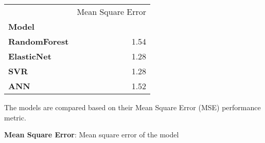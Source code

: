 \documentclass[11pt]{article}
\author{Data to Paper}
\begin{document}
\newsavebox{\mytablebox} %

\begin{lrbox}{\mytablebox}
 \begin{tabular}{lr}
\toprule
{} &  Mean Square Error \\
\textbf{Model       } &                    \\
\midrule
\textbf{RandomForest} &               1.54 \\
\textbf{ElasticNet  } &               1.28 \\
\textbf{SVR         } &               1.28 \\
\textbf{ANN         } &               1.52 \\
\bottomrule
\end{tabular}%
\end{lrbox}

\begin{table}[h]
\caption{Comparison of machine learning models for predicting optimal tracheal tube depth}
\label{table:model_comparisons}
\begin{threeparttable}
\renewcommand{\TPTminimum}{\linewidth}
\begin{tablenotes}
\footnotesize
\item The models are compared based on their Mean Square Error (MSE) performance metric.
\item \textbf{Mean Square Error}: Mean square error of the model
\end{tablenotes}
\end{threeparttable}
\end{table}


\end{document}
